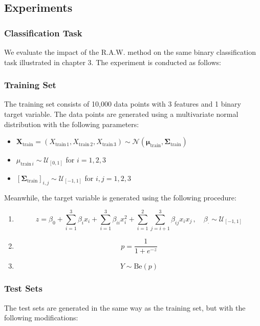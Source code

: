 \subsection{Experiments}
\subsubsection{\textbf{Classification Task}}

We evaluate the impact of the R.A.W. method on the same binary classification task illustrated in chapter 3. The experiment is conducted as follows:
\subsubsection{Training Set}
The training set consists of 10,000 data points with 3 features and 1 binary target variable. The data points are generated using a multivariate normal distribution with the following parameters:

\begin{itemize}
    \item $ \boldsymbol{X}_{\text{train}} = (X_{\text{train}\,1}, X_{\text{train}\,2}, X_{\text{train}\,3}) \sim \mathcal{N}(\boldsymbol{\mu}_{\text{train}}, \boldsymbol{\Sigma}_{\text{train}}) $
    \item $ \mu_{\text{train}\,i} \sim \mathcal{U}_{[0,1]} $ for $ i = 1, 2, 3 $
    \item $ [\boldsymbol{\Sigma}_{\text{train}}]_{i,j} \sim \mathcal{U}_{[-1,1]} $ for $ i, j = 1, 2, 3 $
\end{itemize}

Meanwhile, the target variable is generated using the following procedure:

\begin{enumerate}
    \item $$ 
    z = \beta_0 + \sum_{i=1}^3 \beta_i x_i + \sum_{i=1}^3 \beta_{ii} x_i^2 + \sum_{i=1}^{2} \sum_{j=i+1}^3 \beta_{ij} x_i x_j\,,   \quad \beta_{\cdot} \sim \mathcal{U}_{[-1,1]}
    $$
    \item $$ p = \frac{1}{1 + e^{-z}}$$
    \item $$ Y \sim \text{Be}(p)$$
\end{enumerate}

\subsubsection{Test Sets}
The test sets are generated in the same way as the training set, but with the following modifications:

